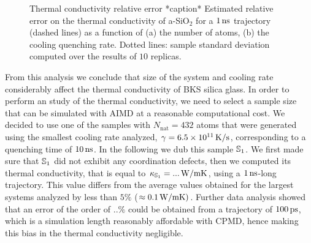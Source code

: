 \begin{figure}[!tb]
    \centering
    \hfill
    \caption{Thermal conductivity relative error *caption*
    Estimated relative error on the thermal conductivity of a-SiO$_2$ for a $1\,\mathrm{ns}$ trajectory (dashed lines) as a function of (a) the number of atoms, (b) the cooling quenching rate. 
    Dotted lines: sample standard deviation computed over the results of $10$ replicas.
    }
    \label{fig:results-class-kappaerror}
\end{figure}

From this analysis we conclude that size of the system and cooling rate considerably affect the thermal conductivity of BKS silica glass. 
In order to perform an \abinitio study of the thermal conductivity, we need to select a sample size that can be simulated with AIMD at a reasonable computational cost. 
We decided to use one of the samples with $N_{\mathrm{nat}}=432$ atoms that were generated using the smallest cooling rate analyzed, $\gamma=6.5\times 10^{11}\,\mathrm{K/s}$, corresponding to a quenching time of $10\,\mathrm{ns}$. In the following we dub this sample $\S1$. 
We first made sure that $\S1$ did not exhibit any coordination defects, then we computed its thermal conductivity, that is equal to $\kappa_\S1 = ... \un{W/mK}$, using a $1\,\mathrm{ns}$-long trajectory. 
This value differs from the average values obtained for the largest systems analyzed by less than $5\%$ ($\approx 0.1\,\mathrm{W/mK})$. 
Further data analysis showed that an error of the order of $..\%$ could be obtained from a trajectory of $100\,\mathrm{ps}$, which is a simulation length reasonably affordable with CPMD, hence making this bias in the thermal conductivity negligible. 



